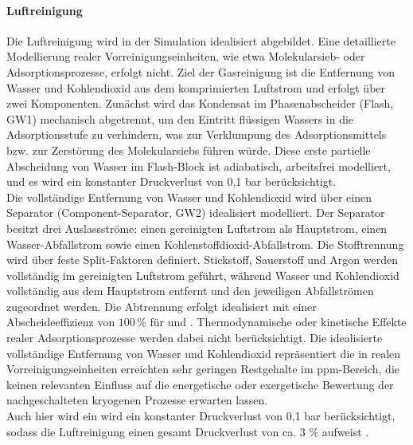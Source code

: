 \paragraph{Luftreinigung}\label{sec:modell_reinigung} Die Luftreinigung wird in der Simulation idealisiert abgebildet. Eine detaillierte Modellierung realer Vorreinigungseinheiten, wie etwa Molekularsieb- oder Adsorptionsprozesse, erfolgt nicht. Ziel der Gasreinigung ist die Entfernung von Wasser und Kohlendioxid aus dem komprimierten Luftstrom und erfolgt über zwei Komponenten. Zunächst wird das Kondensat im Phasenabscheider (Flash, GW1) mechanisch abgetrennt, um den Eintritt flüssigen Wassers in die Adsorptionsstufe zu verhindern, was zur Verklumpung des Adsorptionsmittels bzw. zur Zerstörung des Molekularsiebs führen würde. Diese erste partielle Abscheidung von Wasser im Flash-Block ist adiabatisch, arbeitsfrei modelliert, und es wird ein konstanter Druckverlust von 0,1 bar berücksichtigt. \\
Die vollständige Entfernung von Wasser und Kohlendioxid wird über einen Separator (Component-Separator, GW2) idealisiert modelliert. Der Separator besitzt drei Auslassströme: einen gereinigten Luftstrom als Hauptstrom, einen Wasser-Abfallstrom sowie einen Kohlenstoffdioxid-Abfallstrom. Die Stofftrennung wird über feste Split-Faktoren definiert. Stickstoff, Sauerstoff und Argon werden vollständig im gereinigten Luftstrom geführt, während Wasser und Kohlendioxid vollständig aus dem Hauptstrom entfernt und den jeweiligen Abfallströmen zugeordnet werden. Die Abtrennung erfolgt idealisiert mit einer Abscheideeffizienz von \(100\,\%\) für  und . Thermodynamische oder kinetische Effekte realer Adsorptionsprozesse werden dabei nicht berücksichtigt. Die idealisierte vollständige Entfernung von Wasser und Kohlendioxid repräsentiert die in realen Vorreinigungseinheiten erreichten sehr geringen Restgehalte im ppm-Bereich, die keinen relevanten Einfluss auf die energetische oder exergetische Bewertung der nachgeschalteten kryogenen Prozesse erwarten lassen. \\
Auch hier wird ein wird ein konstanter Druckverlust von 0,1 bar berücksichtigt, sodass die Luftreinigung einen gesamt Druckverlust von ca. 3 \% aufweist \cite{teschExergybasedMethodsApplied}.\\

